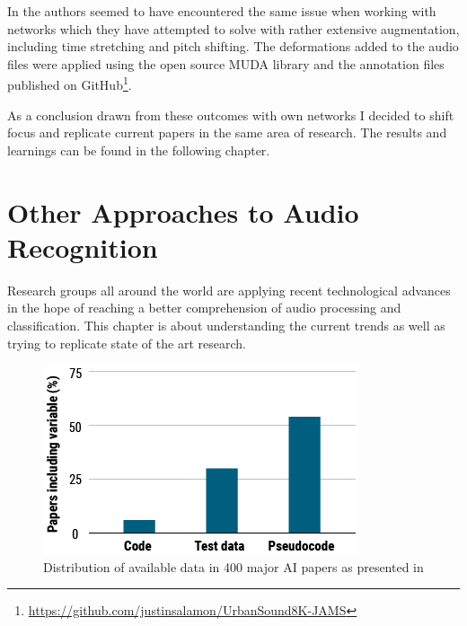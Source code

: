 In \cite{DBLP:journals/corr/SalamonB16} the authors seemed to have encountered the same issue when working with networks which they have attempted to solve with rather extensive augmentation, including time stretching and pitch shifting. The deformations added to the audio files were applied using the open source MUDA library \cite{mcfee2015-augmentation} and the annotation files published on GitHub\footnote{\url{https://github.com/justinsalamon/UrbanSound8K-JAMS}}.

As a conclusion drawn from these outcomes with own networks I decided to shift focus and replicate current papers in the same area of research. The results and learnings can be found in the following chapter.













\chapter{Other Approaches to Audio Recognition}
\label{chap:other}



Research groups all around the world are applying recent technological advances in the hope of reaching a better comprehension of audio processing and classification. This chapter is about understanding the current trends as well as trying to replicate state of the art research. 

\begin{figure}
    \centering
	\includegraphics[width=.45\textwidth]{./images/illustrations/ai-chart}
    \caption{Distribution of available data in 400 major AI papers as presented in \cite{Hutson2018}}
    \label{fig:ai-papers}
\end{figure}

